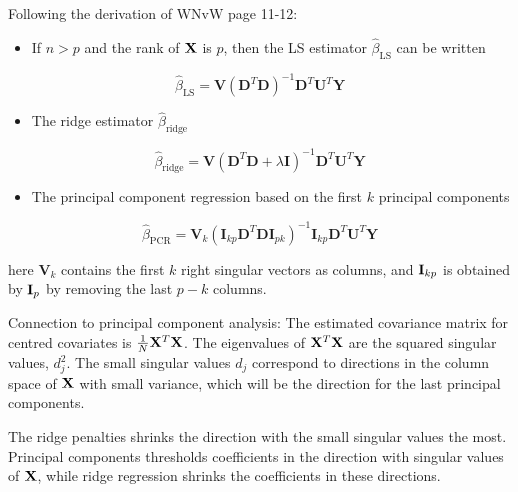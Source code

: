 \documentclass[
  ignorenonframetext,
]{beamer}
\providecommand{\tightlist}{%
  \setlength{\itemsep}{0pt}\setlength{\parskip}{0pt}}
\begin{document}
\begin{frame}

Following the derivation of WNvW page 11-12:

\begin{itemize}
\tightlist
\item
  If \(n>p\) and the rank of \({\bf X}\) is \(p\), then the LS estimator
  \(\hat{\beta}_{\text{LS}}\) can be written
\end{itemize}

\[\hat{\beta}_{\text{LS}}= \mathbf{V}(\mathbf{D}^T \mathbf{D})^{-1} \mathbf{D}^T \mathbf{U}^T \mathbf{Y}\]

\begin{itemize}
\tightlist
\item
  The ridge estimator \(\hat{\beta}_{\text{ridge}}\)
\end{itemize}

\[ \hat{\beta}_{\text{ridge}}=\mathbf{V} (\mathbf{D}^T \mathbf{D} + \lambda \mathbf{I})^{-1}  \mathbf{D}^T \mathbf{U}^T \mathbf{Y}\]

\begin{itemize}
\tightlist
\item
  The principal component regression based on the first \(k\) principal
  components
\end{itemize}

\[ \hat{\beta}_{\text{PCR}} = \mathbf{V}_{k} (\mathbf{I}_{kp} \mathbf{D}^T \mathbf{D}\mathbf{I}_{pk})^{-1} \mathbf{I}_{kp} \mathbf{D}^T \mathbf{U}^T \mathbf{Y}\]

here \(\mathbf{V}_{k}\) contains the first \(k\) right singular vectors
as columns, and \({\bf I}_{kp}\) is obtained by \({\bf I}_p\) by
removing the last \(p-k\) columns.

\end{frame}

\begin{frame}

Connection to principal component analysis: The estimated covariance
matrix for centred covariates is \(\frac{1}{N}{\bf X}^T{\bf X}\). The
eigenvalues of \({\bf X}^T{\bf X}\) are the squared singular values,
\(d^2_j\). The small singular values \(d_j\) correspond to directions in
the column space of \({\bf X}\) with small variance, which will be the
direction for the last principal components.

The ridge penalties shrinks the direction with the small singular values
the most. Principal components thresholds coefficients in the direction
with singular values of \({\bf X}\), while ridge regression shrinks the
coefficients in these directions.

\end{frame}
\end{document}
